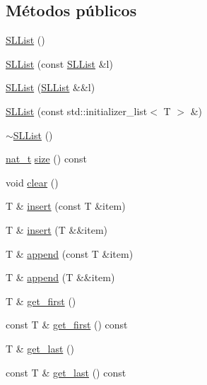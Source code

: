 \subsection*{Métodos públicos}
\begin{DoxyCompactItemize}
\item 
\hyperlink{class_designar_1_1_s_l_list_a160cad3715f206687cde5b49906f225c}{S\+L\+List} ()
\item 
\hyperlink{class_designar_1_1_s_l_list_a83b424655f5d08295fda2ee17e9b5024}{S\+L\+List} (const \hyperlink{class_designar_1_1_s_l_list}{S\+L\+List} \&l)
\item 
\hyperlink{class_designar_1_1_s_l_list_adb47b41f1d0117989a2b5f8b477a8333}{S\+L\+List} (\hyperlink{class_designar_1_1_s_l_list}{S\+L\+List} \&\&l)
\item 
\hyperlink{class_designar_1_1_s_l_list_aae2e56e0b19b4a35dd0e5babed724d04}{S\+L\+List} (const std\+::initializer\+\_\+list$<$ T $>$ \&)
\item 
\hyperlink{class_designar_1_1_s_l_list_a129557e3a5b4555ac45ccae8aaa89f03}{$\sim$\+S\+L\+List} ()
\item 
\hyperlink{namespace_designar_aa72662848b9f4815e7bf31a7cf3e33d1}{nat\+\_\+t} \hyperlink{class_designar_1_1_s_l_list_a1c98e196a2e6d565efff444a590eaf49}{size} () const
\item 
void \hyperlink{class_designar_1_1_s_l_list_a510c26d3fa25eda352665f59c65cb41f}{clear} ()
\item 
T \& \hyperlink{class_designar_1_1_s_l_list_a4a016c1bb14040d6abb8b8eee81b71e9}{insert} (const T \&item)
\item 
T \& \hyperlink{class_designar_1_1_s_l_list_aea19d4f4eed343c1fe28517de0368be9}{insert} (T \&\&item)
\item 
T \& \hyperlink{class_designar_1_1_s_l_list_ae2df2707dddd8c7af8e8d878e1fb58fa}{append} (const T \&item)
\item 
T \& \hyperlink{class_designar_1_1_s_l_list_a2eba31f3a7629a3d96bc87f720f79918}{append} (T \&\&item)
\item 
T \& \hyperlink{class_designar_1_1_s_l_list_ab4e0f44fe834563d47f36aab670b8c83}{get\+\_\+first} ()
\item 
const T \& \hyperlink{class_designar_1_1_s_l_list_a2924b50936033843d23b2d384e751953}{get\+\_\+first} () const
\item 
T \& \hyperlink{class_designar_1_1_s_l_list_ae56fe90795b8fb280bc7361a2426fe53}{get\+\_\+last} ()
\item 
const T \& \hyperlink{class_designar_1_1_s_l_list_add24dd761d9c1ed77a028889beb560c2}{get\+\_\+last} () const

\end{DoxyCompactItemize}
